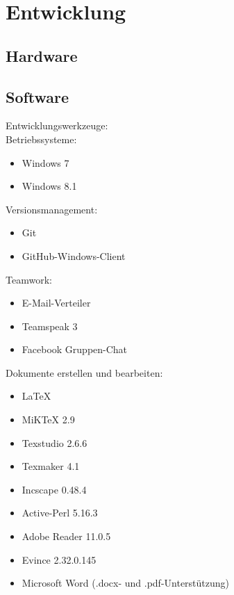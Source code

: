 \chapter{Entwicklung}

\section{Hardware}



\section{Software}

Entwicklungswerkzeuge:\\

Betriebssysteme:

\begin{itemize}

\item Windows 7
\item Windows 8.1

\end{itemize}

Versionsmanagement:

\begin{itemize}

\item Git
\item GitHub-Windows-Client

\end{itemize}

Teamwork:

\begin{itemize}

\item E-Mail-Verteiler
\item Teamspeak 3
\item Facebook Gruppen-Chat

\end{itemize}

Dokumente erstellen und bearbeiten:

\begin{itemize}

\item LaTeX

\item MiKTeX 2.9
\item Texstudio 2.6.6
\item Texmaker 4.1
\item Incscape 0.48.4 
\item Active-Perl 5.16.3
\item Adobe Reader 11.0.5
\item Evince 2.32.0.145

\item Microsoft Word (.docx- und .pdf-Unterstützung)

\end{itemize}

